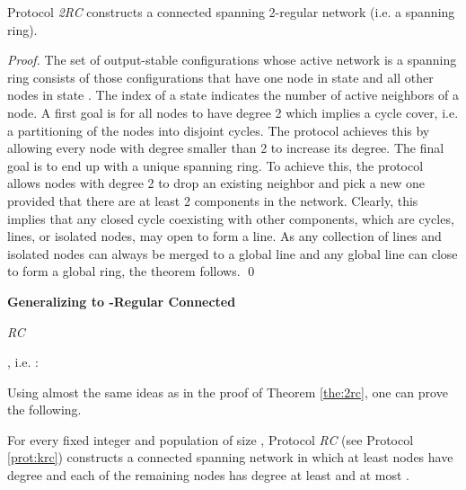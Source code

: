 \documentclass[oribibl, 11pt]{llncs}
\begin{document}
\begin{theorem} \label{the:2rc}
Protocol \emph{2RC} constructs a connected spanning 2-regular network (i.e. a spanning ring).
\end{theorem}
\begin{proof}
The set  of output-stable configurations whose active network is a spanning ring consists of those configurations that have one node in state  and all other nodes in state . The index of a state indicates the number of active neighbors of a node. A first goal is for all nodes to have degree 2 which implies a cycle cover, i.e. a partitioning of the nodes into disjoint cycles. The protocol achieves this by allowing every node with degree smaller than 2 to increase its degree. The final goal is to end up with a unique spanning ring. To achieve this, the protocol allows nodes with degree 2 to drop an existing neighbor and pick a new one provided that there are at least 2 components in the network. Clearly, this implies that any closed cycle coexisting with other components, which are cycles, lines, or isolated nodes, may open to form a line. As any collection of lines and isolated nodes can always be merged to a global line and any global line can close to form a global ring, the theorem follows. 
\qed
\end{proof}

\noindent\textbf{Generalizing to -Regular Connected}

\renewcommand{\algorithmiccomment}[1]{// #1}
\begin{algorithm}[!h]
  \caption{\emph{RC}}\label{prot:krc}
  \begin{algorithmic}
    \medskip
    \State , i.e. 
    \State : 
     
  \end{algorithmic}
\end{algorithm}

Using almost the same ideas as in the proof of Theorem \ref{the:2rc}, one can prove the following. 

\begin{theorem}
For every fixed integer  and population of size , Protocol \emph{RC} (see Protocol \ref{prot:krc}) constructs a connected spanning network in which at least  nodes have degree  and each of the remaining  nodes has degree at least  and at most .
\end{theorem}
\end{document}

